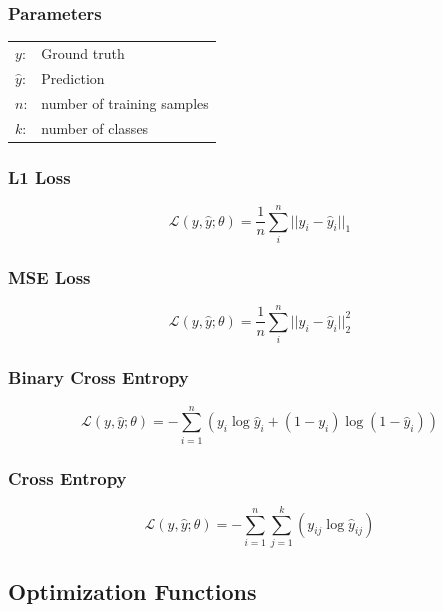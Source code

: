 \documentclass[10pt,a4paper]{article}
\begin{document}
\subsubsection{Parameters}
\begin{tabular}{ll}
	$y$: & Ground truth \\
	$\hat y$: & Prediction \\
	$n$: & number of training samples \\
	$k$: & number of classes
\end{tabular}

\subsubsection{L1 Loss}
$$
	\mathcal L(y, \hat y; \theta) = \frac 1 n \sum_i^n ||y_i - \hat y_i||_1
$$

\subsubsection{MSE Loss}
$$
	\mathcal L(y, \hat y; \theta) = \frac 1 n \sum_i^n ||y_i - \hat y_i||_2^2
$$

\subsubsection{Binary Cross Entropy}
$$
	\mathcal L(y, \hat y; \theta) = - \sum_{i = 1}^n (y_i \log \hat y_i + (1 - y_i) \log(1 - \hat y_i))
$$

\subsubsection{Cross Entropy}
$$
	\mathcal L(y, \hat y; \theta) = - \sum_{i = 1}^n \sum_{j = 1}^k (y_{ij} \log \hat y_{ij})
$$

\subsection{Optimization Functions}
\end{document}
